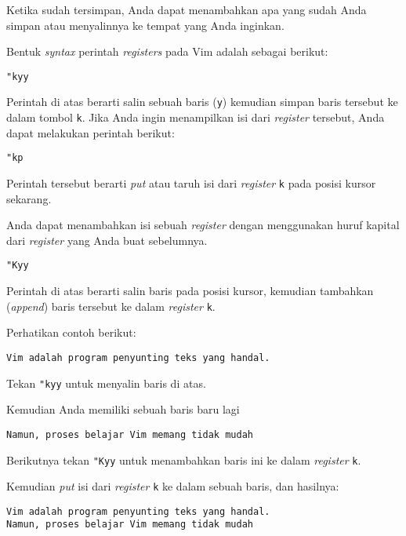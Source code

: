 \documentclass{article}
\begin{document}
Ketika sudah tersimpan, Anda dapat menambahkan apa yang
sudah Anda simpan atau menyalinnya ke tempat yang Anda
inginkan. 

Bentuk \emph{syntax} perintah \emph{registers} pada Vim
adalah sebagai berikut:

\begin{verbatim}
"kyy
\end{verbatim}

Perintah di atas berarti salin sebuah baris (\verb=y=)
kemudian simpan baris tersebut ke dalam tombol \verb=k=.
Jika Anda ingin menampilkan isi dari \emph{register}
tersebut, Anda dapat melakukan perintah berikut:

\begin{verbatim}
"kp
\end{verbatim}

Perintah tersebut berarti \emph{put} atau taruh isi dari
\emph{register} \verb=k= pada posisi kursor sekarang.

Anda dapat menambahkan isi sebuah \emph{register} dengan
menggunakan huruf kapital dari \emph{register} yang Anda
buat sebelumnya.

\begin{verbatim}
"Kyy
\end{verbatim}

Perintah di atas berarti salin baris pada posisi kursor,
kemudian tambahkan (\emph{append}) baris tersebut ke dalam
\emph{register} \verb=k=.

Perhatikan contoh berikut:

\begin{verbatim}
Vim adalah program penyunting teks yang handal.
\end{verbatim}

Tekan \verb="kyy= untuk menyalin baris di atas.

Kemudian Anda memiliki sebuah baris baru lagi

\begin{verbatim}
Namun, proses belajar Vim memang tidak mudah
\end{verbatim}

Berikutnya tekan \verb="Kyy= untuk menambahkan baris ini ke dalam
\emph{register} \verb=k=.

Kemudian \emph{put} isi dari \emph{register} \verb=k= ke
dalam sebuah baris, dan hasilnya:

\begin{verbatim}
Vim adalah program penyunting teks yang handal.
Namun, proses belajar Vim memang tidak mudah
\end{verbatim}
\end{document}
